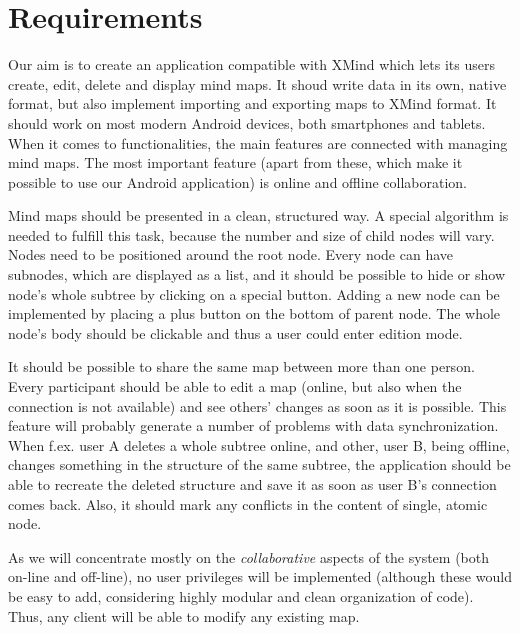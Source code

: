 %
%
%
%
%

\section{Requirements}
\label{sec:requirements}

Our aim is to create an application compatible with XMind which lets its users create, edit, delete and display mind maps. It shoud write data in its own, native format, but also implement importing and exporting maps to XMind format. It should work on most modern Android devices, both smartphones and tablets. When it comes to functionalities, the main features are connected with managing mind maps. The most important feature (apart from these, which make it possible to use our Android application) is online and offline collaboration. 

Mind maps should be presented in a clean, structured way. A special algorithm is needed to fulfill this task, because the number and size of child nodes will vary. Nodes need to be positioned around the root node. Every node can have subnodes, which are displayed as a list, and it should be possible to hide or show node's whole subtree by clicking on a special button. Adding a new node can be implemented by placing a plus button on the bottom of parent node. The whole node's body should be clickable and thus a user could enter edition mode.

It should be possible to share the same map between more than one person. Every participant should be able to edit a map (online, but also when the connection is not available) and see others' changes as soon as it is possible. This feature will probably generate a number of problems with data synchronization. When f.ex. user A deletes a whole subtree online, and other, user B, being offline, changes something in the structure of the same subtree, the application should be able to recreate the deleted structure and save it as soon as user B's connection comes back. Also, it should mark any conflicts in the content of single, atomic node.

As we will concentrate mostly on the \emph{collaborative} aspects of the system (both on-line and off-line), no user privileges will be implemented (although these would be easy to add, considering highly modular and clean organization of code). Thus, any client will be able to modify any existing map.
